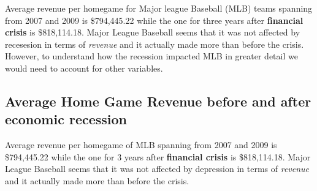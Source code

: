 \documentclass[man, fleqn, noextraspace,floatsintext]{apa6}
\newenvironment{Shaded}{\begin{snugshade}}{\end{snugshade}}
\newcommand{\KeywordTok}[1]{\textcolor[rgb]{0.13,0.29,0.53}{\textbf{#1}}}
\newcommand{\DataTypeTok}[1]{\textcolor[rgb]{0.13,0.29,0.53}{#1}}
\newcommand{\DecValTok}[1]{\textcolor[rgb]{0.00,0.00,0.81}{#1}}
\newcommand{\StringTok}[1]{\textcolor[rgb]{0.31,0.60,0.02}{#1}}
\newcommand{\OtherTok}[1]{\textcolor[rgb]{0.56,0.35,0.01}{#1}}
\newcommand{\OperatorTok}[1]{\textcolor[rgb]{0.81,0.36,0.00}{\textbf{#1}}}
\newcommand{\NormalTok}[1]{#1}
\begin{document}
\begin{Shaded}
\end{Shaded}

Average revenue per homegame for Major league Baseball (MLB) teams
spanning from 2007 and 2009 is \$794,445.22 while the one for three
years after \textbf{financial crisis} is \$818,114.18. Major League
Baseball seems that it was not affected by recesesion in terms of
\emph{revenue} and it actually made more than before the crisis.
However, to understand how the recession impacted MLB in greater detail
we would need to account for other variables.

\subsection{Average Home Game Revenue before and after economic
recession}\label{average-home-game-revenue-before-and-after-economic-recession}

Average revenue per homegame of MLB spanning from 2007 and 2009 is
\$794,445.22 while the one for 3 years after \textbf{financial crisis}
is \$818,114.18. Major League Baseball seems that it was not affected by
depression in terms of \emph{revenue} and it actually made more than
before the crisis.
\end{document}
